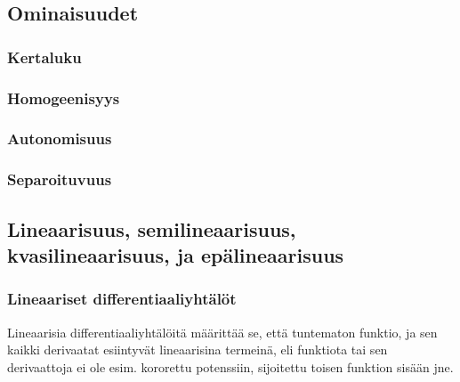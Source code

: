 \documentclass[../johdoksia.tex]{subfiles}
\begin{document}
	
	\subsection{Ominaisuudet}
	
	\subsubsection{Kertaluku}
	
	\subsubsection{Homogeenisyys}
	
	\subsubsection{Autonomisuus}
	
	\subsubsection{Separoituvuus}
	
	\subsection{Lineaarisuus, semilineaarisuus, kvasilineaarisuus, ja epälineaarisuus}
	
	\subsubsection{Lineaariset differentiaaliyhtälöt}
	
	Lineaarisia differentiaaliyhtälöitä määrittää se, että tuntematon funktio, ja sen kaikki derivaatat esiintyvät lineaarisina termeinä, eli funktiota tai sen derivaattoja ei ole esim. kororettu potenssiin, sijoitettu toisen funktion sisään jne.
	
\end{document}
